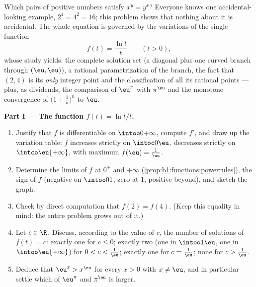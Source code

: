 \begin{problem}\label{pb:b1:functions:1}
Which pairs of positive numbers satisfy $x^y = y^x$? Everyone knows
one accidental-looking example, $2^4 = 4^2 = 16$; this problem shows
that nothing about it is accidental. The whole equation is governed
by the variations of the single function
\[
f(t) = \frac{\ln t}{t} \qquad (t > 0),
\]
whose study yields: the complete solution set (a diagonal plus one
curved branch through $(\eu, \eu)$), a rational parametrization of
the branch, the fact that $(2, 4)$ is its \emph{only} integer point
and the classification of all its rational points --- plus, as
dividends, the comparison of $\eu^\pi$ with $\pi^\eu$ and the
monotone convergence of $\bigl(1 + \frac1n\bigr)^n$ to $\eu$.

\medskip
\noindent\textbf{Part I --- The function $f(t) = \ln t / t$.}
\begin{enumerate}
  \item Justify that $f$ is differentiable on $\intoo0{+\infty}$,
        compute $f'$, and draw up the variation table: $f$
        increases strictly on $\intoc0\eu$, decreases strictly on
        $\intco\eu{+\infty}$, with maximum $f(\eu) = \frac1\eu$.
  \item Determine the limits of $f$ at $0^+$ and $+\infty$
        (\cref{prop:b1:functions:powerrules}), the sign of $f$
        (negative on $\intoo01$, zero at $1$, positive beyond),
        and sketch the graph.
  \item Check by direct computation that $f(2) = f(4)$. (Keep this
        equality in mind: the entire problem grows out of it.)
  \item Let $c \in \R$. Discuss, according to the value of $c$, the
        number of solutions of $f(t) = c$: exactly one for $c \leq
        0$; exactly two (one in $\intoo1\eu$, one in
        $\intoo\eu{+\infty}$) for $0 < c < \frac1\eu$; exactly one
        for $c = \frac1\eu$; none for $c > \frac1\eu$.
  \item Deduce that $\eu^x > x^\eu$ for every $x > 0$ with $x \neq
        \eu$, and in particular settle which of $\eu^\pi$ and
        $\pi^\eu$ is larger.
\end{enumerate}


\end{problem}
